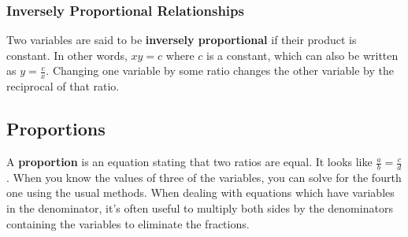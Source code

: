 \documentclass{article}
\begin{document}
\subsubsection*{Inversely Proportional Relationships}
Two variables are said to be \textbf{inversely proportional} if their
product is constant. In other words, $xy = c$ where $c$ is a constant, which
can also be written as $y = \frac{c}{x}$. Changing one variable by some
ratio changes the other variable by the reciprocal of that ratio.

\subsection*{Proportions}
A \textbf{proportion} is an equation stating that two ratios are equal. It
looks like $\frac{a}{b} = \frac{c}{d}$. When you know the values of three of
the variables, you can solve for the fourth one using the usual methods.
When dealing with equations which have variables in the denominator, it's
often useful to multiply both sides by the denominators containing the
variables to eliminate the fractions.
\end{document}

